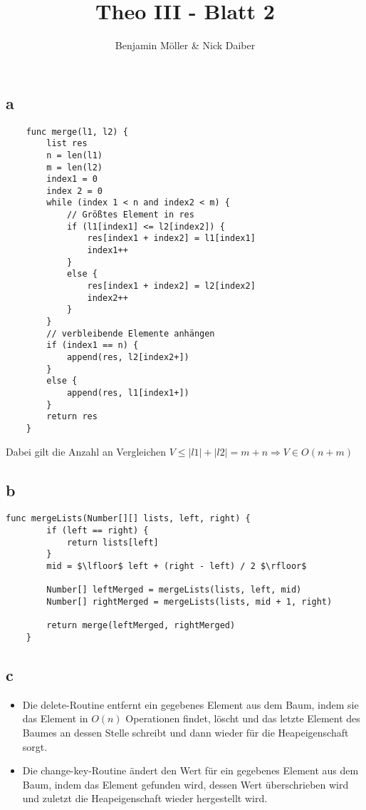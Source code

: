 \documentclass{article}
\title{Theo III - Blatt 2}
\author{Benjamin Möller \& Nick Daiber}
\begin{document}
\maketitle
\section{}
\subsection*{a}
\begin{verbatim}
    func merge(l1, l2) {
        list res
        n = len(l1)
        m = len(l2)
        index1 = 0
        index 2 = 0
        while (index 1 < n and index2 < m) {
            // Größtes Element in res
            if (l1[index1] <= l2[index2]) {
                res[index1 + index2] = l1[index1]
                index1++
            }
            else {
                res[index1 + index2] = l2[index2]
                index2++
            }
        }
        // verbleibende Elemente anhängen
        if (index1 == n) {
            append(res, l2[index2+])
        }
        else {
            append(res, l1[index1+])
        }
        return res
    }
\end{verbatim}

Dabei gilt die Anzahl an Vergleichen $V \leq |l1| + |l2| = m+n \Rightarrow V\in O(n+m)$
\newpage
\subsection*{b}
\begin{lstlisting}[mathescape=true]
    func mergeLists(Number[][] lists, left, right) {
        if (left == right) {
            return lists[left]
        }
        mid = $\lfloor$ left + (right - left) / 2 $\rfloor$

        Number[] leftMerged = mergeLists(lists, left, mid)
        Number[] rightMerged = mergeLists(lists, mid + 1, right)

        return merge(leftMerged, rightMerged)
    }
\end{lstlisting}
\subsection*{c}
\begin{itemize}
    \item {Die delete-Routine entfernt ein gegebenes Element aus dem Baum,
    indem sie das Element in $O(n)$ Operationen findet, löscht und das letzte Element des Baumes
    an dessen Stelle schreibt und dann wieder für die Heapeigenschaft sorgt.}
    \item {Die change-key-Routine ändert den Wert für ein gegebenes Element aus dem Baum,
    indem das Element gefunden wird, dessen Wert überschrieben wird und zuletzt die 
    Heapeigenschaft wieder hergestellt wird.}
\end{itemize}
\newpage
\end{document}

